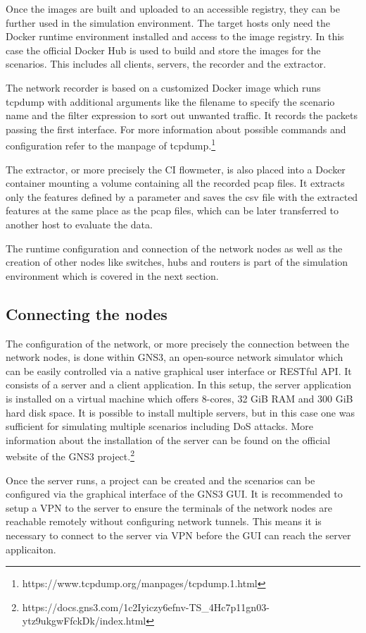 \documentclass[conference]{IEEEtran}
\begin{document}
Once the images are built and uploaded to an accessible registry, they can be further used in the simulation environment. The target hosts only need the Docker runtime environment installed and access to the image registry. In this case the official Docker Hub is used to build and store the images for the scenarios. This includes all clients, servers, the recorder and the extractor.

The network recorder is based on a customized Docker image which runs tcpdump with additional arguments like the filename to specify the scenario name and the filter expression to sort out unwanted traffic. It records the packets passing the first interface. For more information about possible commands and configuration refer to the manpage of tcpdump.\footnote{https://www.tcpdump.org/manpages/tcpdump.1.html}

The extractor, or more precisely the CI flowmeter, is also placed into a Docker container mounting a volume containing all the recorded pcap files. It extracts only the features defined by a parameter and saves the csv file with the extracted features at the same place as the pcap files, which can be later transferred to another host to evaluate the data.

The runtime configuration and connection of the network nodes as well as the creation of other nodes like switches, hubs and routers is part of the simulation environment which is covered in the next section.

\subsection{Connecting the nodes}

The configuration of the network, or more precisely the connection between the network nodes, is done within GNS3, an open-source network simulator which can be easily controlled via a native graphical user interface or RESTful API. It consists of a server and a client application. In this setup, the server application is installed on a virtual machine which offers 8-cores, 32 GiB RAM and 300 GiB hard disk space. It is possible to install multiple servers, but in this case one was sufficient for simulating multiple scenarios including DoS attacks. More information about the installation of the server can be found on the official website of the GNS3 project.\footnote{https://docs.gns3.com/1c2Iyiczy6efnv-TS\_4Hc7p11gn03-ytz9ukgwFfckDk/index.html} 

Once the server runs, a project can be created and the scenarios can be configured via the graphical interface of the GNS3 GUI. It is recommended to setup a VPN to the server to ensure the terminals of the network nodes are reachable remotely without configuring network tunnels. This means it is necessary to connect to the server via VPN before the GUI can reach the server applicaiton.
\end{document}
